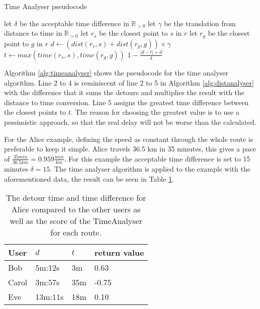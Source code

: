 \begin{algorithm}
	\caption{Time Analyser pseudocode}
	\label{alg:timeanalyser}
	\begin{algorithmic}[1]
		\Require 
		\Statex let $\delta$ be the acceptable time difference in $\mathbb{R}_{>0}$
		\Statex let $\gamma$ be the translation from distance to time in $\mathbb{R}_{>0}$ 
		\Statex 
			\State let $r_s$ be the closest point to $s$ in $r$
			\State let $r_g$ be the closest point to $g$ in $r$
			\State $d \gets (dist(r_s,s) + dist(r_g,g))\times\gamma$
			\State $t \gets max(time(r_s, s), time(r_g, g))$
			\State\Return $1-\frac{|d - t| + d}{\delta}$
		\EndFunction
	\end{algorithmic}
\end{algorithm}

Algorithm \ref{alg:timeanalyser} shows the pseudocode for the time analyser algorithm.
Line 2 to 4 is reminiscent of line 2 to 5 in Algorithm \ref{alg:distanalyser} with the difference that it sums the detours and multiplies the result with the distance to time conversion.
Line 5 assigns the greatest time difference between the closest points to $t$.
The reason for choosing the greatest value is to use a pessimistic approach, so that the real delay will not be worse than the calculated.

For the Alice example, defining the speed as constant through the whole route is preferable to keep it simple.
Alice travels 36.5 km in 35 minutes, this gives a pace of  $\frac{35 min}{36.5 km} = 0.959\frac{min}{km} $.
For this example the acceptable time difference is set to 15 minutes $\delta = 15$.
The time analyser algorithm is applied to the example with the aforementioned data, the result can be seen in Table \ref{tbl:time}.

\begin{table}[!ht]
\centering
\begin{tabular}{@{}llll@{}}
\toprule
\textbf{User} 	& \textbf{$d$} & \textbf{$t$} 	& \textbf{return value} \\ \midrule
Bob         	& 5m:12s       & 3m			    & 0.63				\\
Carol         	& 3m:57s       & 35m	      	& -0.75       		\\
Eve           	& 13m:11s      & 18m			& 0.10        		\\ \bottomrule
\end{tabular}
\caption{The detour time and time difference for Alice compared to the other users as well as the score of the TimeAnalyser for each route.}
\label{tbl:time}
\end{table}
 
